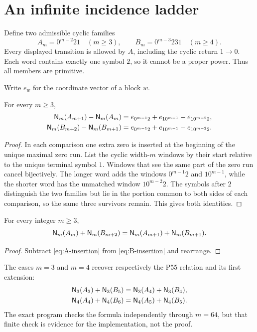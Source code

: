 \section{An infinite incidence ladder}

Define two admissible cyclic families
\begin{equation}\label{eq:families}
 A_m=0^{m-2}21\quad(m\geq3),
 \qquad
 B_m=0^{m-3}231\quad(m\geq4).
\end{equation}
Every displayed transition is allowed by \(A\), including the cyclic return
\(1\to0\).  Each word contains exactly one symbol \(2\), so it cannot be a
proper power.  Thus all members are primitive.

Write \(e_w\) for the coordinate vector of a block \(w\).

\begin{lemma}\label{lem:insertion}
For every \(m\geq3\),
\begin{align}
 \mathsf N_m(A_{m+1})-\mathsf N_m(A_m)
 &=e_{0^{m-1}2}+e_{10^{m-1}}-e_{10^{m-2}2},\label{eq:A-insertion}\\
 \mathsf N_m(B_{m+2})-\mathsf N_m(B_{m+1})
 &=e_{0^{m-1}2}+e_{10^{m-1}}-e_{10^{m-2}2}.\label{eq:B-insertion}
\end{align}
\end{lemma}

\begin{proof}
In each comparison one extra zero is inserted at the beginning of the
unique maximal zero run.  List the cyclic width-\(m\) windows by their start
relative to the unique terminal symbol \(1\).  Windows that see the same
part of the zero run cancel bijectively.  The longer word adds the windows
\(0^{m-1}2\) and \(10^{m-1}\), while the shorter word has the unmatched
window \(10^{m-2}2\).  The symbols after \(2\) distinguish the two families
but lie in the portion common to both sides of each comparison, so the same
three survivors remain.  This gives both identities.
\end{proof}

\begin{theorem}\label{thm:ladder}
For every integer \(m\geq3\),
\begin{equation}\label{eq:ladder}
 \mathsf N_m(A_m)+\mathsf N_m(B_{m+2})
 =\mathsf N_m(A_{m+1})+\mathsf N_m(B_{m+1}).
\end{equation}
\end{theorem}

\begin{proof}
Subtract \eqref{eq:A-insertion} from \eqref{eq:B-insertion} and rearrange.
\end{proof}

The cases \(m=3\) and \(m=4\) recover respectively the P55 relation and its
first extension:
\begin{align*}
 \mathsf N_3(A_3)+\mathsf N_3(B_5)&=\mathsf N_3(A_4)+\mathsf N_3(B_4),\\
 \mathsf N_4(A_4)+\mathsf N_4(B_6)&=\mathsf N_4(A_5)+\mathsf N_4(B_5).
\end{align*}
The exact program checks the formula independently through \(m=64\), but
that finite check is evidence for the implementation, not the proof.
